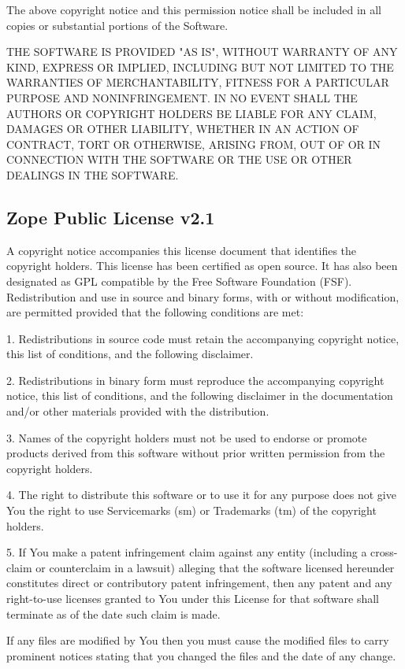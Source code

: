\documentclass[10pt]{article}
\begin{document}
The above copyright notice and this permission notice shall be included in
all copies or substantial portions of the Software.

THE SOFTWARE IS PROVIDED "AS IS", WITHOUT WARRANTY OF ANY KIND, EXPRESS OR
IMPLIED, INCLUDING BUT NOT LIMITED TO THE WARRANTIES OF MERCHANTABILITY,
FITNESS FOR A PARTICULAR PURPOSE AND NONINFRINGEMENT. IN NO EVENT SHALL THE
AUTHORS OR COPYRIGHT HOLDERS BE LIABLE FOR ANY CLAIM, DAMAGES OR OTHER
LIABILITY, WHETHER IN AN ACTION OF CONTRACT, TORT OR OTHERWISE, ARISING FROM,
OUT OF OR IN CONNECTION WITH THE SOFTWARE OR THE USE OR OTHER DEALINGS IN
THE SOFTWARE.

\clearpage
\subsection{Zope Public License v2.1}
A copyright notice accompanies this license document that identifies the 
copyright holders. This license has been certified as open source. It has also 
been designated as GPL compatible by the Free Software Foundation (FSF). 
Redistribution and use in source and binary forms, with or without 
modification, are permitted provided that the following conditions are met:

1. Redistributions in source code must retain the accompanying copyright notice, 
this list of conditions, and the following disclaimer.

2. Redistributions in binary form must reproduce the accompanying copyright 
notice, this list of conditions, and the following disclaimer in the 
documentation and/or other materials provided with the distribution.

3. Names of the copyright holders must not be used to endorse or promote 
products derived from this software without prior written permission from the 
copyright holders.

4. The right to distribute this software or to use it for any purpose does not 
give You the right to use Servicemarks (sm) or Trademarks (tm) of the copyright 
holders.

5. If You make a patent infringement claim against any entity (including a 
cross- claim or counterclaim in a lawsuit) alleging that the software licensed 
hereunder constitutes direct or contributory patent infringement, then any patent 
and any right-to-use licenses granted to You under this License for that software 
shall terminate as of the date such claim is made.

If any files are modified by You then you must cause the modified files to carry 
prominent notices stating that you changed the files and the date of any change.
\end{document}
